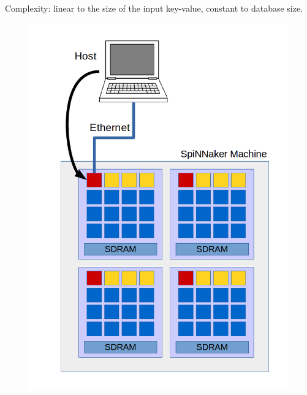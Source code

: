 Complexity: linear to the size of the input key-value, constant to database size.

\begin{figure}
\centering
\begin{minipage}{.32\textwidth}
  \centering
  \includegraphics[width=1\linewidth, natwidth=794, natheight=1123]{images/put1.png}
  \label{fig:host-root}
\end{minipage}%
\begin{minipage}{.32\textwidth}
  \centering

\end{minipage}
\end{figure}
